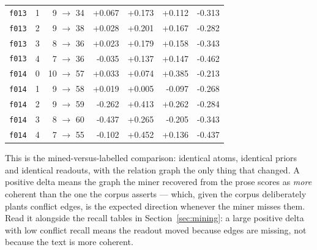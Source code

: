 \documentclass[11pt]{article}
\begin{document}
\begin{table}[htbp]
\begin{tabular}{llrrrrr}
\texttt{f013} & 1 & 9 $\to$ 34 & +0.067 & +0.173 & +0.112 & -0.313 \\
\texttt{f013} & 2 & 9 $\to$ 38 & +0.028 & +0.201 & +0.167 & -0.282 \\
\texttt{f013} & 3 & 8 $\to$ 36 & +0.023 & +0.179 & +0.158 & -0.343 \\
\texttt{f013} & 4 & 7 $\to$ 36 & -0.035 & +0.137 & +0.147 & -0.462 \\
\texttt{f014} & 0 & 10 $\to$ 57 & +0.033 & +0.074 & +0.385 & -0.213 \\
\texttt{f014} & 1 & 9 $\to$ 58 & +0.019 & +0.005 & -0.097 & -0.268 \\
\texttt{f014} & 2 & 9 $\to$ 59 & -0.262 & +0.413 & +0.262 & -0.284 \\
\texttt{f014} & 3 & 8 $\to$ 60 & -0.437 & +0.265 & -0.205 & -0.343 \\
\texttt{f014} & 4 & 7 $\to$ 55 & -0.102 & +0.452 & +0.136 & -0.437 \\
\bottomrule
\end{tabular}
\end{table}

This is the mined-versus-labelled comparison: identical atoms, identical priors and identical readouts, with the relation graph the only thing that changed. A positive delta means the graph the miner recovered from the prose scores as \emph{more} coherent than the one the corpus asserts --- which, given the corpus deliberately plants conflict edges, is the expected direction whenever the miner misses them. Read it alongside the recall tables in Section~\ref{sec:mining}: a large positive delta with low conflict recall means the readout moved because edges are missing, not because the text is more coherent.
\end{document}
